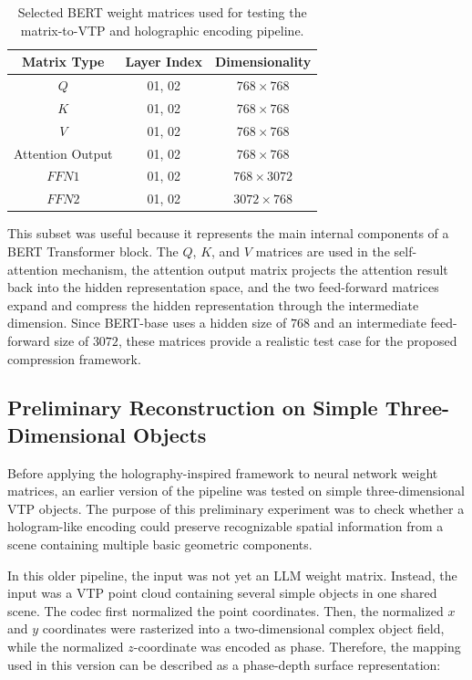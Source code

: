 \documentclass{article}
\begin{document}
\begin{normalsize}
\begin{table}[H]
    \centering
    \begin{tabular}{|c|c|c|}
        \hline
        \textbf{Matrix Type} & \textbf{Layer Index} & \textbf{Dimensionality} \\
        \hline
        \(Q\) & 01, 02 & \(768 \times 768\) \\
        \hline
        \(K\) & 01, 02 & \(768 \times 768\) \\
        \hline
        \(V\) & 01, 02 & \(768 \times 768\) \\
        \hline
        Attention Output & 01, 02 & \(768 \times 768\) \\
        \hline
        \(FFN1\) & 01, 02 & \(768 \times 3072\) \\
        \hline
        \(FFN2\) & 01, 02 & \(3072 \times 768\) \\
        \hline
    \end{tabular}
    \caption{Selected BERT weight matrices used for testing the matrix-to-VTP and holographic encoding pipeline.}
    \label{tab:bert_test_matrices}
\end{table}

This subset was useful because it represents the main internal components of a BERT Transformer block. The \(Q\), \(K\), and \(V\) matrices are used in the self-attention mechanism, the attention output matrix projects the attention result back into the hidden representation space, and the two feed-forward matrices expand and compress the hidden representation through the intermediate dimension. Since BERT-base uses a hidden size of \(768\) and an intermediate feed-forward size of \(3072\), these matrices provide a realistic test case for the proposed compression framework.

\subsection{Preliminary Reconstruction on Simple Three-Dimensional Objects}

Before applying the holography-inspired framework to neural network weight matrices, an earlier version of the pipeline was tested on simple three-dimensional VTP objects. The purpose of this preliminary experiment was to check whether a hologram-like encoding could preserve recognizable spatial information from a scene containing multiple basic geometric components.

In this older pipeline, the input was not yet an LLM weight matrix. Instead, the input was a VTP point cloud containing several simple objects in one shared scene. The codec first normalized the point coordinates. Then, the normalized \(x\) and \(y\) coordinates were rasterized into a two-dimensional complex object field, while the normalized \(z\)-coordinate was encoded as phase. Therefore, the mapping used in this version can be described as a phase-depth surface representation:


\end{normalsize}
\end{document}
